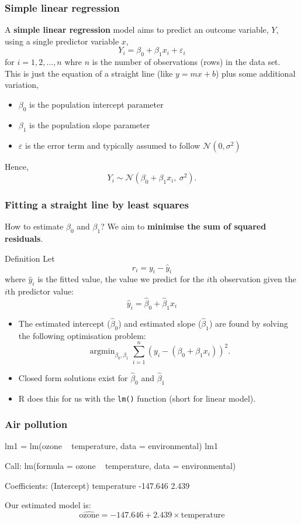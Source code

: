 \documentclass[a4paper]{article}\usepackage[]{graphicx}\usepackage[]{xcolor}
\DeclareMathOperator*{\argmin}{argmin}
\begin{document}
\subsubsection{Simple linear regression}
A \textbf{simple linear regression} model aims to predict an outcome variable, \( Y \), using a single predictor variable \( x \),
\[
	Y_i = \beta_0 + \beta_1 x_i + \varepsilon_i
\]
for \( i = 1,2,\dotsc,n \) whre \( n \) is the number of observations (rows) in the data set.\\
This is just the equation of a straight line (like \( y = mx + b \)) plus some additional variation,
\begin{itemize}
	\item \( \beta_0 \) is the population intercept parameter
	\item \( \beta_1 \) is the population slope parameter
	\item \( \varepsilon \) is the error term and typically assumed to follow \( \mathcal{N}(0,\sigma^2) \)
\end{itemize}
Hence,
\[
	Y_i \sim \mathcal{N}( \beta_0 + \beta_1 x_i,\ \sigma^2).
\]
\subsubsection{Fitting a straight line by least squares}
How to estimate \( \beta_0 \) and \( \beta_1 \)? We aim to \textbf{minimise the sum of squared residuals}.
\begin{bluebox}{Definition}
	Let
	\[
		r_i = y_i - \hat{y}_i
	\]
	where \( \hat{y}_i \) is the fitted value, the value we predict for the \( i \)th observation given the \( i \)th predictor value:
	\[
		\hat{y}_i = \hat{\beta}_0 + \hat{\beta}_1 x_i
	\]
\end{bluebox}
\begin{itemize}
	\item The estimated intercept (\( \hat{\beta}_0 \)) and estimated slope (\( \hat{\beta}_1 \)) are found by solving the following optimisation problem:
	\[
		\argmin_{\beta_0, \beta_1}\sum_{i=1}^n (y_i - (\beta_0 + \beta_1x_i))^2.
	\]
	\item Closed form solutions exist for \( \hat{\beta}_0 \) and \( \hat{\beta}_1 \)
	\item R does this for us with the \lstinline|lm()| function (short for linear model).
\end{itemize}
\subsubsection{Air pollution}
\begin{Schunk}
\begin{Sinput}
lm1 = lm(ozone ~ temperature, 
         data = environmental)
lm1
\end{Sinput}
\begin{Soutput}

Call:
lm(formula = ozone ~ temperature, data = environmental)

Coefficients:
(Intercept)  temperature  
   -147.646        2.439  
\end{Soutput}
\end{Schunk}
Our estimated model is:
\[
	\widehat{\text{ozone}} = -147.646 + 2.439\times \text{temperature}
\]
\end{document}
